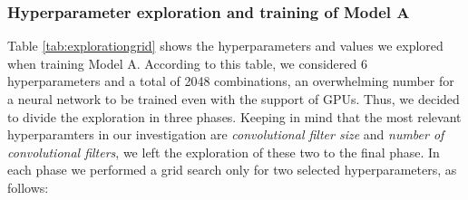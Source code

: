 \documentclass[10pt,journal,compsoc, onecolumn]{IEEEtran}
\begin{document}
\subsubsection{Hyperparameter exploration and training of Model A}\label{sec:trainingmodelA}

\begin{table}[h]
    \centering
    \caption{Hyperparameter exploration for Model A}
    \label{tab:explorationgrid}
\end{table}

Table \ref{tab:explorationgrid} shows the hyperparameters and values we explored when training Model A. According to this table, we considered 6 hyperparameters and a total of 2048 combinations, an overwhelming number for a neural network to be trained even with the support of GPUs. Thus, we decided to divide the exploration in three phases. Keeping in mind that the most relevant hyperparamters in our investigation are \textit{convolutional filter size} and \textit{number of convolutional filters}, we left the exploration of these two to the final phase. In each phase we performed a grid search only for two selected hyperparameters, as follows:
\end{document}
